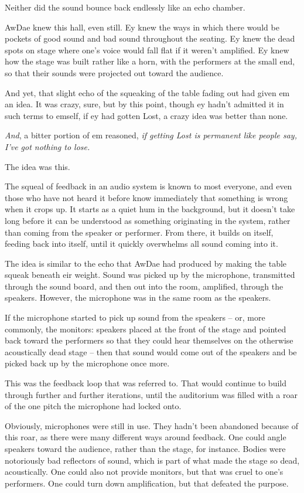 Neither did the sound bounce back endlessly like an echo chamber.

AwDae knew this hall, even still.  Ey knew the ways in which there would be pockets of good sound and bad sound throughout the seating.  Ey knew the dead spots on stage where one's voice would fall flat if it weren't amplified.  Ey knew how the stage was built rather like a horn, with the performers at the small end, so that their sounds were projected out toward the audience.

And yet, that slight echo of the squeaking of the table fading out had given em an idea.  It was crazy, sure, but by this point, though ey hadn't admitted it in such terms to emself, if ey had gotten Lost, a crazy idea was better than none.

\textit{And}, a bitter portion of em reasoned, \textit{if getting Lost \emph{is} permanent like people say, I've got nothing to lose.}

The idea was this.

The squeal of feedback in an audio system is known to most everyone, and even those who have not heard it before know immediately that something is wrong when it crops up.  It starts as a quiet hum in the background, but it doesn't take long before it can be understood as something originating in the system, rather than coming from the speaker or performer.  From there, it builds on itself, feeding back into itself, until it quickly overwhelms all sound coming into it.

The idea is similar to the echo that AwDae had produced by making the table squeak beneath eir weight.  Sound was picked up by the microphone, transmitted through the sound board, and then out into the room, amplified, through the speakers.  However, the microphone was in the same room as the speakers.

If the microphone started to pick up sound from the speakers -- or, more commonly, the monitors: speakers placed at the front of the stage and pointed back toward the performers so that they could hear themselves on the otherwise acoustically dead stage -- then that sound would come out of the speakers and be picked back up by the microphone once more.

This was the feedback loop that was referred to.  That would continue to build through further and further iterations, until the auditorium was filled with a roar of the one pitch the microphone had locked onto.

Obviously, microphones were still in use.  They hadn't been abandoned because of this roar, as there were many different ways around feedback.  One could angle speakers toward the audience, rather than the stage, for instance.  Bodies were notoriously bad reflectors of sound, which is part of what made the stage so dead, acoustically.  One could also not provide monitors, but that was cruel to one's performers.  One could turn down amplification, but that defeated the purpose.


